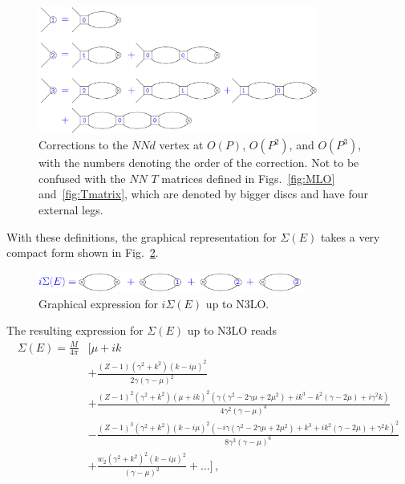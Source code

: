 \documentclass[prl,
twocolumn,
showpacs,preprintnumbers,amsmath,amssymb,
superscriptaddress,
a4paper,nofootinbib,longbibliography]{revtex4-2}
\begin{document}
\begin{figure}[htb]
    \centering
    \includegraphics[width=0.82\textwidth]{figs/Deuteron_Vertex_Orders_v1.pdf}
    \caption{Corrections to the $NNd$ vertex at $O(P)$, $O(P^2)$, and $O(P^3)$, with the numbers denoting the order of the correction. Not to be confused with the $NN$ $T$ matrices defined in Figs.~\ref{fig:MLO} and~\ref{fig:Tmatrix}, which are denoted by bigger discs and have four external legs.}
    \label{fig:DeuteronVertex}
\end{figure}
With these definitions, the graphical representation for $\Sigma(E)$ takes a very compact form shown in Fig.~\ref{fig:Sigma}.
\begin{figure}[htb]
    \centering
    \includegraphics[width=0.78\textwidth]{figs/Sigma_Graphs_v2.pdf}
    \caption{Graphical expression for $i\Sigma(E)$ up to N3LO.}
    \label{fig:Sigma}
\end{figure}
The resulting expression for $\Sigma(E)$ up to N3LO reads
\begingroup
\allowdisplaybreaks[0]
\begin{align}
    \Sigma(E) = \frac{M}{4\pi}&\Bigg[\mu + ik \nonumber \\
    &+\frac{(Z-1) \left(\gamma ^2+k^2\right) (k-i \mu )^2}{2 \gamma  (\gamma -\mu )^2}\nonumber \\
    &+\frac{(Z-1)^2 \left(\gamma ^2+k^2\right) (\mu +i k)^2 \left(\gamma  \left(\gamma ^2-2 \gamma  \mu +2 \mu ^2\right)+i k^3-k^2 (\gamma -2 \mu )+i \gamma ^2 k\right)}{4 \gamma ^2 (\gamma -\mu )^4}\nonumber\\
    &-\frac{(Z-1)^3 \left(\gamma ^2+k^2\right) (k-i \mu )^2 \left(-i \gamma  \left(\gamma ^2-2 \gamma  \mu +2 \mu ^2\right)+k^3+i k^2 (\gamma -2 \mu
   )+\gamma ^2 k\right)^2}{8 \gamma ^3 (\gamma -\mu )^6}\nonumber\\
   &+\frac{w_2 \left(\gamma ^2+k^2\right)^2 (k-i \mu )^2}{(\gamma -\mu )^2}+\dots
    \Bigg]\,,
\end{align}
\end{document}
